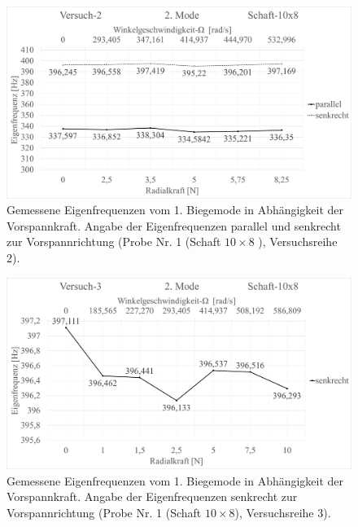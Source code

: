 	\begin{figure}[H]
		\centering
		\includegraphics[width=0.95\linewidth, height=0.36\textheight]{Ergebnisse/Schaft_10x8_2Mode_ver2}
		\caption{Gemessene Eigenfrequenzen vom 1. Biegemode in Abhängigkeit der Vorspannkraft. Angabe der Eigenfrequenzen parallel und senkrecht zur Vorspannrichtung (Probe Nr. 1 (Schaft $ 10\times8 $ ), Versuchsreihe 2).}
		\label{fig:Result-Schaft-10x8-2Mode-Ver2}
	\end{figure}

	\begin{figure}[H]
		\centering
		\includegraphics[width=0.95\linewidth, height=0.36\textheight]{Ergebnisse/Schaft_10x8_2Mode_ver3}
		\caption{Gemessene Eigenfrequenzen vom 1. Biegemode in Abhängigkeit der Vorspannkraft. Angabe der Eigenfrequenzen senkrecht zur Vorspannrichtung (Probe Nr. 1 (Schaft $ 10\times8 $), Versuchsreihe 3).}
		\label{fig:Result-Schaft-10x8-2Mode-Ver3}
	\end{figure}
	
